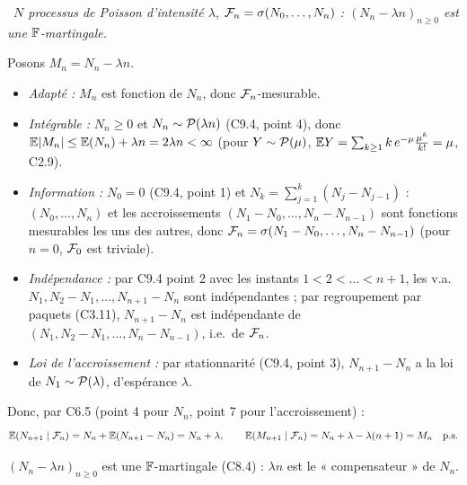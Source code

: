 \documentclass[11pt,a4paper]{article}
\newcommand{\question}[2]{\par\medskip\noindent\textbf{#1}~\textit{#2}\par\smallskip}
\begin{document}
\begin{exo}
\question{}{$N$ processus de Poisson d'intensité $\lambda$, $\mathcal{F}_n=\sigma(N_0,\dots,N_n)$ : $(N_n-\lambda n)_{n\ge0}$ est une $\mathbb{F}$-martingale.}
Posons $M_n=N_n-\lambda n$.
\begin{itemize}
  \item \emph{Adapté :} $M_n$ est fonction de $N_n$, donc $\mathcal{F}_n$-mesurable.
  \item \emph{Intégrable :} $N_n\ge0$ et $N_n\sim\mathcal{P}(\lambda n)$ (C9.4, point 4), donc $\mathbb{E}|M_n|\le\mathbb{E}(N_n)+\lambda n=2\lambda n<\infty$
  (pour $Y\sim\mathcal{P}(\mu)$, $\mathbb{E} Y=\sum_{k\ge1}k\,e^{-\mu}\frac{\mu^k}{k!}=\mu$, C2.9).
  \item \emph{Information :} $N_0=0$ (C9.4, point 1) et $N_k=\sum_{j=1}^k(N_j-N_{j-1})$ : $(N_0,\dots,N_n)$ et les accroissements
  $(N_1-N_0,\dots,N_n-N_{n-1})$ sont fonctions mesurables les uns des autres, donc $\mathcal{F}_n=\sigma(N_1-N_0,\dots,N_n-N_{n-1})$ (pour $n=0$,
  $\mathcal{F}_0$ est triviale).
  \item \emph{Indépendance :} par C9.4 point 2 avec les instants $1<2<\dots<n+1$, les v.a.\ $N_1,N_2-N_1,\dots,N_{n+1}-N_n$ sont
  indépendantes ; par regroupement par paquets (C3.11), $N_{n+1}-N_n$ est indépendante de $(N_1,N_2-N_1,\dots,N_n-N_{n-1})$, i.e.\ de $\mathcal{F}_n$.
  \item \emph{Loi de l'accroissement :} par stationnarité (C9.4, point 3), $N_{n+1}-N_n$ a la loi de $N_1\sim\mathcal{P}(\lambda)$, d'espérance $\lambda$.
\end{itemize}
Donc, par C6.5 (point 4 pour $N_n$, point 7 pour l'accroissement) :
\[\mathbb{E}(N_{n+1}\mid\mathcal{F}_n)=N_n+\mathbb{E}(N_{n+1}-N_n)=N_n+\lambda,\qquad\mathbb{E}(M_{n+1}\mid\mathcal{F}_n)=N_n+\lambda-\lambda(n+1)=M_n\quad\text{p.s.}\]
\begin{resultat}$(N_n-\lambda n)_{n\ge0}$ est une $\mathbb{F}$-martingale (C8.4) : $\lambda n$ est le « compensateur » de $N_n$.\end{resultat}
\end{exo}
\end{document}
